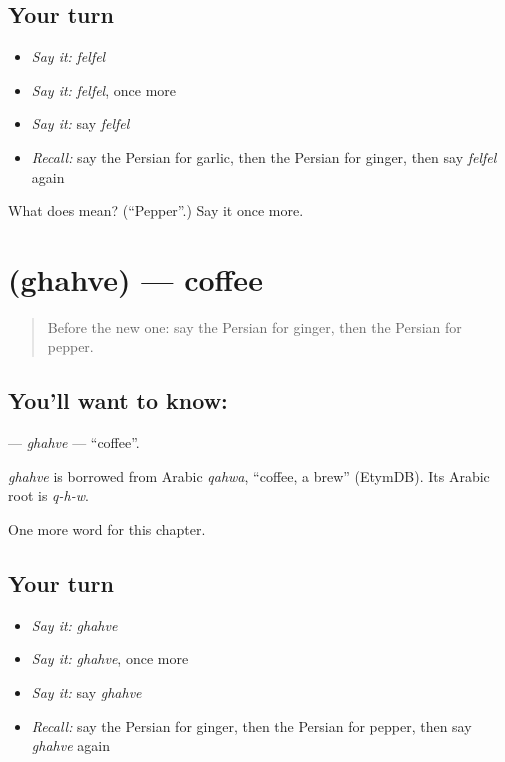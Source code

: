 \subsection*{Your turn}
\begin{itemize}
\raggedright
  \item \emph{Say it:} \emph{felfel}
  \item \emph{Say it:} \emph{felfel}, once more
  \item \emph{Say it:} say \emph{felfel}
  \item \emph{Recall:} say the Persian for garlic, then the Persian for ginger, then say \emph{felfel} again
\end{itemize}

\begin{tcolorbox}[breakable,colback=teal!4,colframe=teal!35!black,title={Before you move on}]
What does  mean? (\textquotedblleft{}Pepper\textquotedblright{}.) Say it once more.
\end{tcolorbox}
\section[\texorpdfstring{\fa{قهوه} (ghahve)}{قهوه (ghahve)}]{ (ghahve) — coffee}

\label{lesson:FA-C102-ghahve}



\begin{quote}
Before the new one: say the Persian for ginger, then the Persian for pepper.
\end{quote}

\subsection*{You'll want to know: }
\textbf{} — \emph{ghahve} — \textquotedblleft{}coffee\textquotedblright{}.

\begin{cousinweb}
\emph{ghahve} is borrowed from Arabic \emph{qahwa}, \textquotedblleft{}coffee, a brew\textquotedblright{} (EtymDB). Its Arabic root is \emph{q-h-w}.
\end{cousinweb}

\begin{grammarlens}[title={What you've built}]
One more word for this chapter.
\end{grammarlens}

\subsection*{Your turn}
\begin{itemize}
\raggedright
  \item \emph{Say it:} \emph{ghahve}
  \item \emph{Say it:} \emph{ghahve}, once more
  \item \emph{Say it:} say \emph{ghahve}
  \item \emph{Recall:} say the Persian for ginger, then the Persian for pepper, then say \emph{ghahve} again
\end{itemize}

